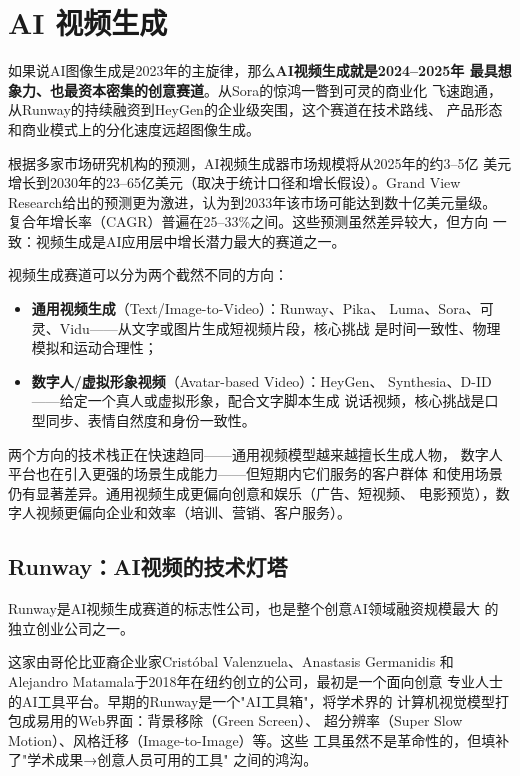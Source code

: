 
\section{AI 视频生成}
\label{sec:create-video}

如果说AI图像生成是2023年的主旋律，那么\textbf{AI视频生成就是2024--2025年
最具想象力、也最资本密集的创意赛道}。从Sora的惊鸿一瞥到可灵的商业化
飞速跑通，从Runway的持续融资到HeyGen的企业级突围，这个赛道在技术路线、
产品形态和商业模式上的分化速度远超图像生成。

根据多家市场研究机构的预测，AI视频生成器市场规模将从2025年的约3--5亿
美元增长到2030年的23--65亿美元（取决于统计口径和增长假设）。Grand View
Research给出的预测更为激进，认为到2033年该市场可能达到数十亿美元量级。
复合年增长率（CAGR）普遍在25--33\%之间。这些预测虽然差异较大，但方向
一致：视频生成是AI应用层中增长潜力最大的赛道之一。

视频生成赛道可以分为两个截然不同的方向：
\begin{itemize}
  \item \textbf{通用视频生成}（Text/Image-to-Video）：Runway、Pika、
    Luma、Sora、可灵、Vidu——从文字或图片生成短视频片段，核心挑战
    是时间一致性、物理模拟和运动合理性；
  \item \textbf{数字人/虚拟形象视频}（Avatar-based Video）：HeyGen、
    Synthesia、D-ID——给定一个真人或虚拟形象，配合文字脚本生成
    说话视频，核心挑战是口型同步、表情自然度和身份一致性。
\end{itemize}

两个方向的技术栈正在快速趋同——通用视频模型越来越擅长生成人物，
数字人平台也在引入更强的场景生成能力——但短期内它们服务的客户群体
和使用场景仍有显著差异。通用视频生成更偏向创意和娱乐（广告、短视频、
电影预览），数字人视频更偏向企业和效率（培训、营销、客户服务）。

\subsection{Runway：AI视频的技术灯塔}
\label{subsec:runway}

Runway是AI视频生成赛道的标志性公司，也是整个创意AI领域融资规模最大
的独立创业公司之一。

这家由哥伦比亚裔企业家Cristóbal Valenzuela、Anastasis Germanidis
和Alejandro Matamala于2018年在纽约创立的公司，最初是一个面向创意
专业人士的AI工具平台。早期的Runway是一个"AI工具箱"，将学术界的
计算机视觉模型打包成易用的Web界面：背景移除（Green Screen）、
超分辨率（Super Slow Motion）、风格迁移（Image-to-Image）等。这些
工具虽然不是革命性的，但填补了"学术成果→创意人员可用的工具"
之间的鸿沟。

